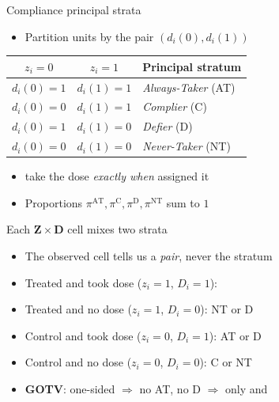 \documentclass[table, xcolor = {dvipsnames}, 9pt]{beamer}
\theoremstyle{plain}
\newcommand{\mh}[1]{{\color{magenta}{#1}}}
\begin{document}
\begin{frame}[t]{Compliance principal strata}
\vfill
\begin{itemize} \vfill
\item Partition units by the pair $\left(d_i(0), d_i(1)\right)$ \vfill
\end{itemize}
\vfill
\begin{table}[H]
\centering
\begin{tabular}{c|c|l}
$z_i = 0$ & $z_i = 1$ & Principal stratum \\ \hline
$d_i(0) = 1$ & $d_i(1) = 1$ & \textit{Always-Taker} (AT) \\
$d_i(0) = 0$ & $d_i(1) = 1$ & \textit{Complier} (C) \\
$d_i(0) = 1$ & $d_i(1) = 0$ & \textit{Defier} (D) \\
$d_i(0) = 0$ & $d_i(1) = 0$ & \textit{Never-Taker} (NT) \\
\end{tabular}
\end{table}
\vfill
\begin{itemize} \vfill
\item \mh{Compliers} take the dose \emph{exactly when} assigned it \vfill
\item Proportions $\pi^{\textrm{AT}}, \pi^{\textrm{C}}, \pi^{\textrm{D}}, \pi^{\textrm{NT}}$ sum to $1$ \vfill
\end{itemize} \vfill
\end{frame}
\begin{frame}[t]{Each $\bm{Z}\times\bm{D}$ cell mixes two strata}
\vfill
\begin{itemize} \vfill
\item The observed cell tells us a \emph{pair}, never the stratum \vfill
\item Treated and took dose ($z_i = 1$, $D_i = 1$): \mh{C or AT} \vfill
\item Treated and no dose ($z_i = 1$, $D_i = 0$): NT or D \vfill
\item Control and took dose ($z_i = 0$, $D_i = 1$): AT or D \vfill
\item Control and no dose ($z_i = 0$, $D_i = 0$): C or NT \vfill
\item \textbf{GOTV}: one-sided $\Rightarrow$ no AT, no D $\Rightarrow$ only \mh{Compliers} and \mh{Never-Takers} \vfill
\end{itemize} \vfill
\end{frame}
\end{document}
